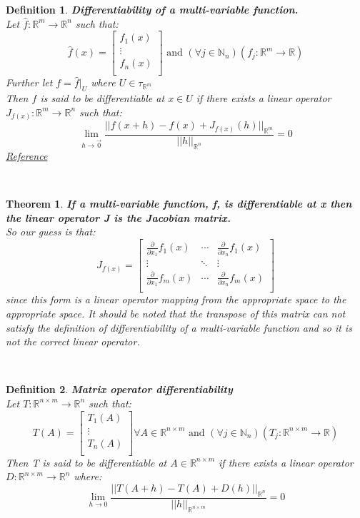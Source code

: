 \documentclass[12pt]{extarticle}
\theoremstyle{plain}
\newtheorem{thm}{Theorem}[section]
\theoremstyle{plain}
\theoremstyle{plain}
\theoremstyle{Definition}
\newtheorem{def.}{Definition}[section]
\theoremstyle{Definition}
\theoremstyle{plain}
\newcommand{\cut}[0]{\noindent\framebox[\linewidth]{\rule{\linewidth}{2pt}}\\}
\begin{document}
\newpage
\begin{def.} \textbf{Differentiability of a multi-variable function.} \\
	Let $\hat{f} : \mathbb{R}^m \to \mathbb{R}^n$ such that: \\ 
	\[
	\hat{f}(x) = 
	\begin{bmatrix}
	f_1(x) \\ 
	\vdots \\
	f_n(x) \\
	\end{bmatrix}
	\text{ and } 
	(\forall j \in \mathbb{N}_n)(f_j : \mathbb{R}^m \to \mathbb{R})
	\]
	Further let $f = \hat{f}|_U$ where $U \in \tau_{\mathbb{R}^m}$ \\ 
	Then $f$ is said to be differentiable at $x \in U$ if there exists a linear operator $J_{f(x)}: \mathbb{R}^m \to \mathbb{R}^n$ such that: \\ 
	$$\lim_{h \to \vec{0}} \frac{||f(x + h) - f(x) + J_{f(x)}(h)||_{\mathbb{R}^m}}{||h||_{\mathbb{R}^n}} = 0$$
	\href{https://en.wikipedia.org/wiki/Differentiable_function}{Reference}
\end{def.}
\cut
\begin{thm} \textbf{If a multi-variable function, f, is differentiable at x then the linear operator J is the Jacobian matrix.} \\ 
	So our guess is that: \\ 
	\[
	J_{f(x)} = 
	\begin{bmatrix}
	\frac{\partial}{\partial x_1} f_1(x) & \cdots & \frac{\partial}{\partial x_n} f_1(x) \\ 
	\vdots & \ddots & \vdots \\ 
	\frac{\partial}{\partial x_1} f_m(x) & \cdots & \frac{\partial}{\partial x_n} f_m(x) \\ 
	\end{bmatrix}
	\]
	since this form is a linear operator mapping from the appropriate space to the appropriate space. It should be noted that the transpose of this matrix can not satisfy the definition of differentiability of a multi-variable function and so it is not the correct linear operator. 
\end{thm}
\cut
\begin{def.} \textbf{Matrix operator differentiability} \\ 
	Let $T : \mathbb{R}^{n\times m} \to \mathbb{R}^n$ such that: \\
	\[
	T(A) = 
	\begin{bmatrix}
	T_1(A) \\ 
	\vdots \\ 
	T_n(A) \\ 	
	\end{bmatrix}
	\forall A \in \mathbb{R}^{n\times m}
	\text{ and } (\forall j \in \mathbb{N}_n)(T_j : \mathbb{R}^{n \times m} \to \mathbb{R})
	\]
	Then T is said to be differentiable at $A \in \mathbb{R}^{n \times m}$ if there exists a linear operator $D : \mathbb{R}^{n \times m} \to \mathbb{R}^n$ where: \\ 
	$$\lim_{h \to 0} \frac{||T(A + h) - T(A) + D(h)||_{\mathbb{R}^n}}{||h||_{\mathbb{R}^{n\times m}}} = 0$$
\end{def.}
\end{document}
